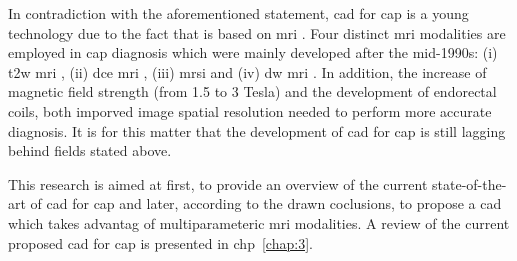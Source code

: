 In contradiction with the aforementioned statement, \ac{cad} for \ac{cap} is a young technology due to the fact that is based on \ac{mri} \cite{Hegde2013}.
Four distinct \ac{mri} modalities are employed in \ac{cap} diagnosis which were mainly developed after the mid-1990s: (i) \ac{t2w} \ac{mri} \cite{Hricak1983}, (ii) \ac{dce} \ac{mri} \cite{HuchBoni1995}, (iii) \ac{mrsi} \cite{Kurhanewicz1996} and (iv) \ac{dw} \ac{mri} \cite{Scheidler1999}.
In addition, the increase of magnetic field strength (from 1.5 to 3 Tesla) and the development of endorectal coils, both imporved image spatial resolution \cite{Swanson2001} needed to perform more accurate diagnosis.
It is for this matter that the development of \ac{cad} for \ac{cap} is still lagging behind fields stated above.

This research is aimed at first, to provide an overview of the current state-of-the-art of \ac{cad} for \ac{cap} and later, according to the drawn coclusions, to propose a \ac{cad} which takes advantag of multiparameteric \ac{mri} modalities. 
A review of the current proposed \ac{cad} for \ac{cap} is presented in \acs{chp}~\ref{chap:3}.

 



